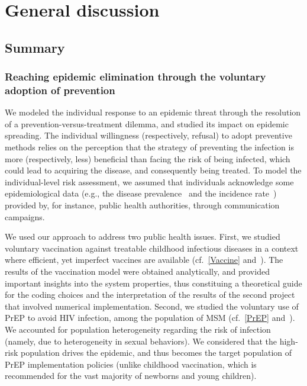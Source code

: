 %
\chapter{General discussion}
\label{Discussion}

\section{Summary}

\subsection{Reaching epidemic elimination through the voluntary adoption of prevention}

We modeled the individual response to an epidemic threat through the resolution of a prevention-versus-treatment dilemma, and studied its impact on epidemic spreading. The individual willingness (respectively, refusal) to adopt preventive methods relies on the perception that the strategy of preventing the infection is more (respectively, less) beneficial than facing the risk of being infected, which could lead to acquiring the disease, and consequently being treated. To model the individual-level risk assessment, we assumed that individuals acknowledge some epidemiological data (e.g., the disease prevalence~\cite[]{Jijon2017} and the incidence rate~\cite[]{Jijon2020}) provided by, for instance, public health authorities, through communication campaigns. 

We used our approach to address two public health issues. First, we studied voluntary vaccination against treatable childhood infectious diseases in a context where efficient, yet imperfect vaccines are available (cf.~\autoref{Vaccine} and~\cite[]{Jijon2017}). The results of the vaccination model were obtained analytically, and provided important insights into the system properties, thus constituing a theoretical guide for the coding choices and the interpretation of the results of the second project that involved numerical implementation. Second, we studied the voluntary use of PrEP to avoid HIV infection, among the population of MSM (cf.~\autoref{PrEP} and~\cite[]{Jijon2020}). We accounted for population heterogeneity regarding the risk of infection (namely, due to heterogeneity in sexual behaviors). We considered that the high-risk population drives the epidemic, and thus becomes the target population of PrEP implementation policies (unlike childhood vaccination, which is recommended for the vast majority of newborns and young children). 

